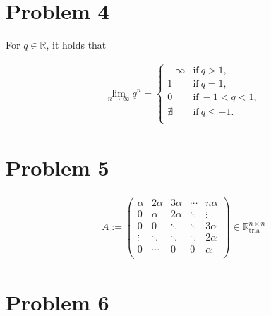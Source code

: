 \documentclass[]{article}
\begin{document}
\section*{Problem 4}

For $q \in \mathbb{R}$, it holds that

\begin{align*}
	\lim\limits_{n \to \infty} q^n = 
	\left\{
	\begin{array}{ll}
		+\infty & \textrm{if}\ q > 1, \\
		1 & \textrm{if}\ q = 1, \\
		0 & \textrm{if}\ -1 < q < 1, \\
		\nexists & \textrm{if}\ q \leq -1. \\
	\end{array}
	\right.
\end{align*}


\section*{Problem 5}

\begin{align*}
	A := \left(
	\begin{array}{ccccc}
		\alpha & 2\alpha & 3\alpha & \cdots & n\alpha \\
		0      & \alpha  & 2\alpha & \ddots & \vdots  \\
		0      & 0       & \ddots  & \ddots & 3\alpha \\
		\vdots & \ddots  & \ddots  & \ddots & 2\alpha \\
		0      & \cdots  & 0       & 0      & \alpha  \\
	\end{array}
	\right) \in \mathbb{R}^{n \times n}_{\textrm{tria}}
\end{align*}


\section*{Problem 6}
\end{document}
